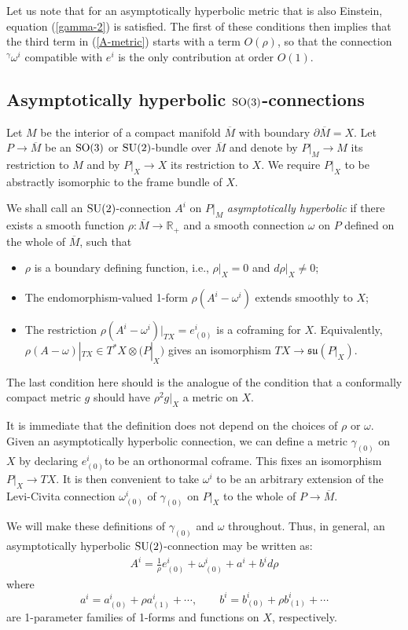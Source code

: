 \documentclass[a4paper,12pt]{article}
\newcommand{\R}{{\mathbb R}}
\newcommand{\be}{\begin{eqnarray}}
\newcommand{\ee}{\end{eqnarray}}
\begin{document}
Let us note that for an asymptotically hyperbolic metric that is also Einstein, equation (\ref{gamma-2}) is satisfied. The first of these conditions then implies that the third term in (\ref{A-metric}) starts with a term $O(\rho)$, so that the connection ${}^\gamma\omega^i$ compatible with $e^i$ is the only contribution at order $O(1)$. 

\subsection{Asymptotically hyperbolic ${\rm SO}(3)$-connections}

Let $M$ be the interior of a compact manifold $\overline{M}$ with boundary $\partial\overline M=X$. Let $P\to\overline M$ be an ${\rm SO}(3)$ or ${\rm SU}(2)$-bundle over $\overline M$ and denote by $P|_M\to M$ its restriction to $M$ and by $P|_X\to X$ its restriction to $X$. We require $P|_X$ to be abstractly isomorphic to the frame bundle of $X$.

We shall call an ${\rm SU}(2)$-connection $A^i$ on $P|_M$ \emph{asymptotically hyperbolic} if there exists a smooth function $\rho:\overline{M}\to\R_+$ and a smooth connection $\omega$ on $P$ defined on the whole of $\overline{M}$, such that
\begin{itemize}
 \item $\rho$ is a boundary defining function, i.e., $\rho|_{X}=0$ and $d\rho|_{X}\neq0$;
 \item The endomorphism-valued 1-form $\rho(A^i-\omega^i)$ extends smoothly to $X$;
 \item The restriction $\rho(A^i-\omega^i)|_{TX}=e^i_{(0)}$ is a coframing for $X$. Equivalently, $\rho(A-\omega)|_{TX} \in T^*X \otimes \mathfrak(P|_X)$ gives an isomorphism $TX \to \mathfrak{su}(P|_X)$.
\end{itemize}
The last condition here should is the analogue of the condition that a conformally compact metric $g$ should have $\rho^2g|_X$ a metric on $X$.

It is immediate that the definition does not depend on the choices of $\rho$ or $\omega$. Given an asymptotically hyperbolic connection, we can define a metric $\gamma_{(0)}$ on $X$ by declaring $e^i_{(0)}$to be an orthonormal coframe. This fixes an isomorphism $P|_X \to TX$. It is then convenient to take $\omega^i$ to be an arbitrary extension of the Levi-Civita connection $\omega_{(0)}^i$ of $\gamma_{(0)}$ on $P|_X$ to the whole of $P \to \overline{M}$. 

We will make these definitions of $\gamma_{(0)}$ and $\omega$ throughout. Thus, in general, an asymptotically hyperbolic ${\rm SU}(2)$-connection may be written as:
\be\label{as-hyperb-conn}
A^i=\frac{1}{\rho}e^i_{(0)}+\omega^i_{(0)}+a^i+b^id\rho
\ee
where
\[ a^i=a^i_{(0)}+\rho a^i_{(1)}+\cdots, \qquad b^i=b^i_{(0)}+\rho b^i_{(1)}+\cdots \]
are 1-parameter families of 1-forms and functions on $X$, respectively. 
\end{document}
